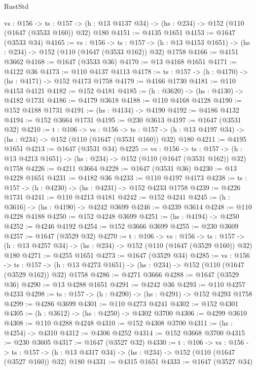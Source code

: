 \begin{lexlean}{RustStd}
\begin{coremodule}
  {vs : @156} ->
  {ts : @157} -> (h : @13 @4137 @34) -> (hs : @234) -> @152 (@110 (@1647 (@3533 @160)) @32) @180
@4151 := @4135 @1651
@4153 := @1647 (@3533 @34)
@4165 := {vs : @156} ->
  {ts : @157} -> (h : @13 @4153 @1651) -> (hs : @234) -> @152 (@110 (@1647 (@3533 @162)) @32) @1758
@4166 := @4151 @3662
@4168 := @1647 (@3533 @36)
@4170 := @13 @4168 @1651
@4171 := @4122 @36
@4173 := @110 @4137 @4113
@4178 := {ts : @157} -> (h : @4170) -> (hs : @4171) -> @152 @4173 @1758
@4179 := @4166 @1730
@4181 := @110 @4153 @4121
@4182 := @152 @4181
@4185 := (h : @3620) -> (hs : @4130) -> @4182 @1731
@4186 := @4179 @3618
@4188 := @110 @4168 @4128
@4190 := @152 @4188 @1731
@4191 := (hs : @4134) -> @4190
@4192 := @4186 @4132
@4194 := @152 @3664 @1731
@4195 := @230 @3613
@4197 := @1647 (@3531 @32)
@4210 := {t : @106} ->
  {vs : @156} ->
  {ts : @157} -> (h : @13 @4197 @34) -> (hs : @234) -> @152 (@110 (@1647 (@3531 @160)) @32) @180
@4211 := @4195 @1651
@4213 := @1647 (@3531 @34)
@4225 := {vs : @156} ->
  {ts : @157} -> (h : @13 @4213 @1651) -> (hs : @234) -> @152 (@110 (@1647 (@3531 @162)) @32) @1758
@4226 := @4211 @3664
@4228 := @1647 (@3531 @36)
@4230 := @13 @4228 @1651
@4231 := @4182 @36
@4233 := @110 @4197 @4173
@4238 := {ts : @157} -> (h : @4230) -> (hs : @4231) -> @152 @4233 @1758
@4239 := @4226 @1731
@4241 := @110 @4213 @4181
@4242 := @152 @4241
@4245 := (h : @3616) -> (hs : @4190) -> @4242 @3699
@4246 := @4239 @3614
@4248 := @110 @4228 @4188
@4250 := @152 @4248 @3699
@4251 := (hs : @4194) -> @4250
@4252 := @4246 @4192
@4254 := @152 @3666 @3699
@4255 := @230 @3609
@4257 := @1647 (@3529 @32)
@4270 := {t : @106} ->
  {vs : @156} ->
  {ts : @157} -> (h : @13 @4257 @34) -> (hs : @234) -> @152 (@110 (@1647 (@3529 @160)) @32) @180
@4271 := @4255 @1651
@4273 := @1647 (@3529 @34)
@4285 := {vs : @156} ->
  {ts : @157} -> (h : @13 @4273 @1651) -> (hs : @234) -> @152 (@110 (@1647 (@3529 @162)) @32) @1758
@4286 := @4271 @3666
@4288 := @1647 (@3529 @36)
@4290 := @13 @4288 @1651
@4291 := @4242 @36
@4293 := @110 @4257 @4233
@4298 := {ts : @157} -> (h : @4290) -> (hs : @4291) -> @152 @4293 @1758
@4299 := @4286 @3699
@4301 := @110 @4273 @4241
@4302 := @152 @4301
@4305 := (h : @3612) -> (hs : @4250) -> @4302 @3700
@4306 := @4299 @3610
@4308 := @110 @4288 @4248
@4310 := @152 @4308 @3700
@4311 := (hs : @4254) -> @4310
@4312 := @4306 @4252
@4314 := @152 @3668 @3700
@4315 := @230 @3605
@4317 := @1647 (@3527 @32)
@4330 := {t : @106} ->
  {vs : @156} ->
  {ts : @157} -> (h : @13 @4317 @34) -> (hs : @234) -> @152 (@110 (@1647 (@3527 @160)) @32) @180
@4331 := @4315 @1651
@4333 := @1647 (@3527 @34)

\end{coremodule}
\end{lexlean}
